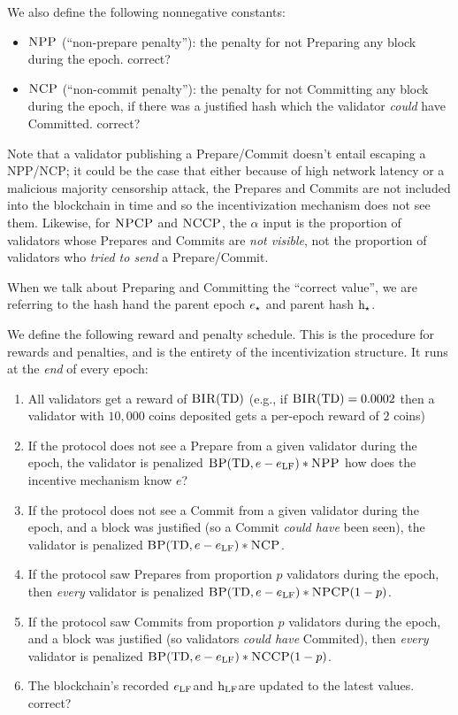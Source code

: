 \documentclass[12pt, final]{article}
\newcommand*{\todo}[1]{\color{red} #1}
\newcommand{\epoch}{\ensuremath{e}\space}
\newcommand{\hash}{\textnormal{h}\space}
\newcommand{\epochsource}{\ensuremath{\epoch_{\star}}\space}
\newcommand{\hashsource}{\ensuremath{\hash_{\star}}\space}
\newcommand{\totaldeposit}{\textnormal{TD}\space}
\newcommand{\epochLF}{\ensuremath{\epoch_{\textnormal{LF}}}\space}
\newcommand{\hashLF}{\ensuremath{\hash_{\textnormal{LF}}}\space}
\newcommand{\BIR}{\textsc{BIR}\space}
\newcommand{\BP}{\textsc{BP}\space}
\newcommand{\NCP}{\textsc{NCP}\space}
\newcommand{\NCCP}{\textsc{NCCP}\space}
\newcommand{\NPP}{\textsc{NPP}\space}
\newcommand{\NPCP}{\textsc{NPCP}\space}
\begin{document}
We also define the following nonnegative constants:
\begin{itemize}
    \item $\NPP$ (``non-prepare penalty''): the penalty for not Preparing any block during the epoch. \todo{correct?}
    \item $\NCP$ (``non-commit penalty''): the penalty for not Committing any block during the epoch, if there was a justified hash which the validator \emph{could} have Committed. \todo{correct?}
\end{itemize}


Note that a validator publishing a Prepare/Commit doesn't entail escaping a \NPP/\NCP; it could be the case that either because of high network latency or a malicious majority censorship attack, the Prepares and Commits are not included into the blockchain in time and so the incentivization mechanism does not see them. Likewise, for $\NPCP$ and $\NCCP$, the $\alpha$ input is the proportion of validators whose Prepares and Commits are \emph{not visible}, not the proportion of validators who \emph{tried to send} a Prepare/Commit. 

When we talk about Preparing and Committing the ``correct value'', we are referring to the hash \hash and the parent epoch $\epochsource$ and parent hash $\hashsource$.

We define the following reward and penalty schedule.  This is the procedure for rewards and penalties, and is the entirety of the incentivization structure.  It runs at the \emph{end} of every epoch:
    \begin{enumerate}
    \item All validators get a reward of $\BIR(\totaldeposit)$ (e.g., if $\BIR(\totaldeposit) = 0.0002$ then a validator with $10,000$ coins deposited gets a per-epoch reward of $2$ coins)
    \item If the protocol does not see a Prepare from a given validator during the epoch, the validator is penalized $\BP(\totaldeposit, \epoch - \epochLF) * \NPP$ \todo{how does the incentive mechanism know \epoch?}
    \item If the protocol does not see a Commit from a given validator during the epoch, and a block was justified (so a Commit \emph{could have} been seen), the validator is penalized $\BP(\totaldeposit, \epoch - \epochLF) * \NCP$.
    \item If the protocol saw Prepares from proportion $p$ validators during the epoch, then \emph{every} validator is penalized $\BP(\totaldeposit, \epoch - \epochLF) * \NPCP(1 - p)$.
    \item If the protocol saw Commits from proportion $p$ validators during the epoch, and a block was justified (so validators \emph{could have} Commited), then \emph{every} validator is penalized $\BP(\totaldeposit, \epoch - \epochLF) * \NCCP(1 - p)$.
    \item The blockchain's recorded \epochLF and \hashLF are updated to the latest values. \todo{correct?}
    \end{enumerate}
\end{document}
